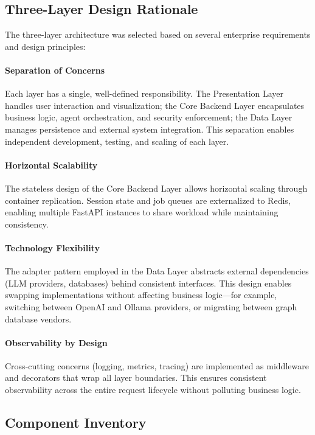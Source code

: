 \subsection{Three-Layer Design Rationale}

The three-layer architecture was selected based on several enterprise requirements and design principles:

\paragraph{Separation of Concerns}
Each layer has a single, well-defined responsibility. The Presentation Layer handles user interaction and visualization; the Core Backend Layer encapsulates business logic, agent orchestration, and security enforcement; the Data Layer manages persistence and external system integration. This separation enables independent development, testing, and scaling of each layer.

\paragraph{Horizontal Scalability}
The stateless design of the Core Backend Layer allows horizontal scaling through container replication. Session state and job queues are externalized to Redis, enabling multiple FastAPI instances to share workload while maintaining consistency.

\paragraph{Technology Flexibility}
The adapter pattern employed in the Data Layer abstracts external dependencies (LLM providers, databases) behind consistent interfaces. This design enables swapping implementations without affecting business logic---for example, switching between OpenAI and Ollama providers, or migrating between graph database vendors.

\paragraph{Observability by Design}
Cross-cutting concerns (logging, metrics, tracing) are implemented as middleware and decorators that wrap all layer boundaries. This ensures consistent observability across the entire request lifecycle without polluting business logic.

\subsection{Component Inventory}

